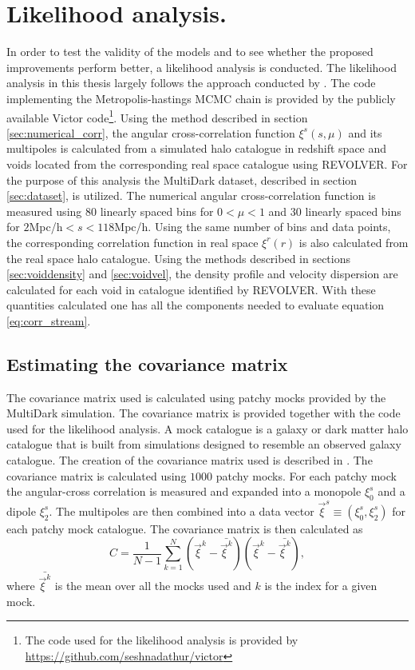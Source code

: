 \section{Likelihood analysis.}\label{sec:maximum_likelihood_method}
In order to test the validity of the models and to see whether the proposed improvements perform better, a likelihood analysis is conducted. The likelihood analysis in this thesis largely follows the approach conducted by \cite{BeyondBAO}. The code implementing the Metropolis-hastings MCMC chain is provided by the publicly available Victor code\footnote{The code used for the likelihood analysis is provided by \url{https://github.com/seshnadathur/victor}}. Using the method described in section \ref{sec:numerical_corr}, the angular cross-correlation function $\xi^s(s,\mu)$ and its multipoles is calculated from a simulated halo catalogue in redshift space and voids located from the corresponding real space catalogue using REVOLVER. For the purpose of this analysis the MultiDark dataset, described in section \ref{sec:dataset}, is utilized. The numerical angular cross-correlation function is measured using $80$ linearly spaced bins for $0<\mu<1$ and $30$ linearly spaced bins for $2$Mpc/h$<s<118$Mpc/h. Using the same number of bins and data points, the corresponding correlation function in real space $\xi^r(r)$ is also calculated from the real space halo catalogue. Using the methods described in sections \ref{sec:voiddensity} and \ref{sec:voidvel}, the density profile and velocity dispersion are calculated for each void in catalogue identified by REVOLVER. With these quantities calculated one has all the components needed to evaluate equation \ref{eq:corr_stream}.
\subsection{Estimating the covariance matrix}
The covariance matrix used is calculated using patchy mocks provided by the MultiDark simulation\cite{MDmock1}\cite{MDmock2}. The covariance matrix is provided together with the code used for the likelihood analysis. A mock catalogue is a galaxy or dark matter halo catalogue that is built from simulations designed to resemble an observed galaxy catalogue. The creation of the covariance matrix used is described in \cite{BeyondBAO}. The covariance matrix is calculated using $1000$ patchy mocks. For each patchy mock the angular-cross correlation is measured and expanded into a monopole $\xi_0^s$ and a dipole $\xi_2^s$. The multipoles are then combined into a data vector $\vec{\xi}^s\equiv(\xi_0^s, \xi_2^s)$ for each patchy mock catalogue. The covariance matrix is then calculated as
\begin{equation}
    C=\frac{1}{N-1}\sum_{k=1}^N(\vec{\xi} ^k-\bar{\vec{\xi}^k})(\vec{\xi}^k-\bar{\vec{\xi}^k}),
\end{equation} 
where $\bar{\vec{\xi}^k}$ is the mean over all the mocks used and $k$ is the index for a given mock.
